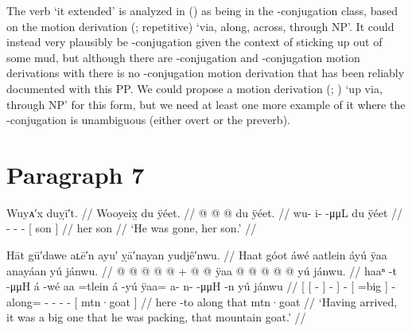 The verb  ‘it extended’ is analyzed in (\lastx) as being in the -conjugation class, based on the motion derivation  (;  repetitive) ‘via, along, across, through NP’.
It could instead very plausibly be -conjugation given the context of sticking up out of some mud, but although there are -conjugation and -conjugation motion derivations with  there is no -conjugation motion derivation that has been reliably documented with this PP.
We could propose a motion derivation  (; ) ‘up via, through NP’ for this form, but we need at least one more example of it where the -conjugation is unambiguous (either overt  or the  preverb).

\section{Paragraph 7}\label{sec:92-para-7}

\ex\label{ex:92-139-absent-her-son}%
%
\begingl
	\glpreamble	Wuyᴀ′x duỵī′t. //
	\glpreamble	Wooyeix̱ du ÿéet. //
	\gla	{} @ {} @ {} @ {} {} du ÿéet. {} //
	\glb	wu- i-  -μμL {} du ÿéet {} //
	\glc	{}- -  - {}[  son {}] //
	\gld	{} {} {} {} {} her son {} //
	\glft	‘He was gone, her son.’
		//
\endgl
\xe


\ex\label{ex:92-140-packing-big-mtn-goat}%
%
\begingl
	\glpreamble	Hāt gū′dawe aʟē′n ayu′ ỵā′nayan yudjê′nwu. //
	\glpreamble	Haat góot áwé aatlein áyú ÿaa anayáan yú jánwu. //
	\gla	{} {}  @ {} {}  @ {} @ {} @ {} {}  @ {} +
		{}  @ {} {}  @ {} 
		ÿaa @  @ {} @ {} @ {} @ {}
		{} yú jánwu. {} //
	\glb	{} {} haaⁿ -t {} {}  -μμH {} {} á -wé
		{} aa =tlein {} á -yú
		ÿaa= a- n-  -μμH -n
		{} yú jánwu {} //
	\glc	{}[ {}[  - {}]
			\·  - \· {}]
		 -
		{}[  =big {}]  -
		along= - -  - -
		{}[  mtn·goat {}] //
	\gld	{} {} here -to {}  {} {} {} {}
		 {}
		{}  {} {}  {}
		along  {} {} {} {}
		{} that mtn·goat {} //
	\glft	‘Having arrived, it was a big one that he was packing, that mountain goat.’
		//
\endgl
\xe

